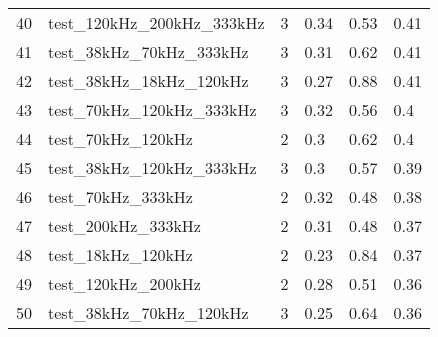 \begin{longtable}{llllll}
40                     & test\_120kHz\_200kHz\_333kHz                      & 3                        & 0.34                           & 0.53                        & 0.41                           \\
41                     & test\_38kHz\_70kHz\_333kHz                        & 3                        & 0.31                           & 0.62                        & 0.41                           \\
42                     & test\_38kHz\_18kHz\_120kHz                        & 3                        & 0.27                           & 0.88                        & 0.41                           \\
43                     & test\_70kHz\_120kHz\_333kHz                       & 3                        & 0.32                           & 0.56                        & 0.4                            \\
44                     & test\_70kHz\_120kHz                               & 2                        & 0.3                            & 0.62                        & 0.4                            \\
45                     & test\_38kHz\_120kHz\_333kHz                       & 3                        & 0.3                            & 0.57                        & 0.39                           \\
46                     & test\_70kHz\_333kHz                               & 2                        & 0.32                           & 0.48                        & 0.38                           \\
47                     & test\_200kHz\_333kHz                              & 2                        & 0.31                           & 0.48                        & 0.37                           \\
48                     & test\_18kHz\_120kHz                               & 2                        & 0.23                           & 0.84                        & 0.37                           \\
49                     & test\_120kHz\_200kHz                              & 2                        & 0.28                           & 0.51                        & 0.36                           \\
50                     & test\_38kHz\_70kHz\_120kHz                        & 3                        & 0.25                           & 0.64                        & 0.36                           \\

\end{longtable}
